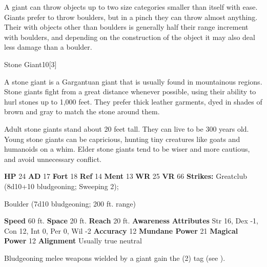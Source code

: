         A giant can throw objects up to two size categories smaller than itself with ease.
        Giants prefer to throw boulders, but in a pinch they can throw almost anything.
        Their  with objects other than boulders is generally half their range increment with boulders, and depending on the construction of the object it may also deal less damage than a boulder.
  

  \begin{monsubsection}{Stone Giant}{10}[3]
    \vspace{-1em}\vspace{-1em}
    \vspace{0em}

    
          A stone giant is a Gargantuan giant that is usually found in mountainous regions.
          Stone giants fight from a great distance whenever possible, using their ability to hurl stones up to 1,000 feet.
          They prefer thick leather garments, dyed in shades of brown and gray to match the stone around them.
        
          Adult stone giants stand about 20 feet tall.
          They can live to be 300 years old.
          Young stone giants can be capricious, hunting tiny creatures like goats and humanoids on a whim.
          Elder stone giants tend to be wiser and more cautious, and avoid unnecessary conflict.
        

    \begin{spellcontent}
      \begin{spelltargetinginfo}
        \pari \textbf{HP} 24 \monsep
          \textbf{AD} 17 \monsep
          \textbf{Fort} 18 \monsep
          \textbf{Ref} 14 \monsep
          \textbf{Ment} 13
        \pari \textbf{WR} 25 \monsep
        \textbf{VR} 66
        \pari \textbf{Strikes:}
            Greatclub  (8d10+10 bludgeoning; Sweeping 2);
\par Boulder  (7d10 bludgeoning; 200 ft. range)
      \end{spelltargetinginfo}
    \end{spellcontent}
    \begin{monsterfooter}
      \pari \textbf{Speed} 60 ft. \monsep
        \textbf{Space} 20 ft. \monsep
        \textbf{Reach} 20 ft.
      \pari \textbf{Awareness} 
      \pari \textbf{Attributes}
        Str 16, Dex -1,
        Con 12, Int 0,
        Per 0, Wil -2
      \pari \textbf{Accuracy} 12 \monsep
        \textbf{Mundane Power} 21 \monsep
      \textbf{Magical Power} 12
      \pari \textbf{Alignment} Usually true neutral
    \end{monsterfooter}
  \end{monsubsection}
        Bludgeoning melee weapons wielded by a giant gain the  (2) tag (see ).
      
